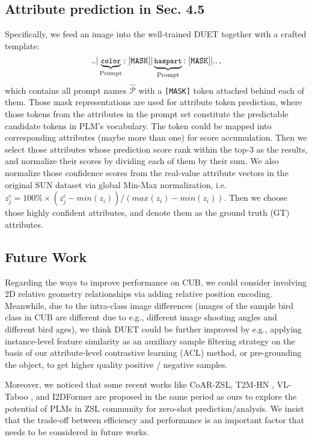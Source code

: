 \documentclass[letterpaper]{article} \usepackage{aaai23}  \usepackage{times}  \usepackage{helvet}  \usepackage{courier}  \usepackage[hyphens]{url}  \usepackage{graphicx} \urlstyle{rm} \def\UrlFont{\rm}  \usepackage{natbib}  \usepackage{caption} \frenchspacing  \setlength{\pdfpagewidth}{8.5in}  \setlength{\pdfpageheight}{11in}  \usepackage{algorithm}
\begin{document}
\subsection{Attribute prediction in Sec. 4.5}\label{apd:ap}
Specifically, we feed an image into the well-trained DUET together with a crafted template:
\begin{equation}
\small
	{\tt{..}} {\tt|} \underbrace{{\tt{color}}}_{\textrm{Prompt}} {\tt:}~  {\tt{[MASK]}}  {\tt|}  \underbrace{{\tt{has part}}}_{\textrm{Prompt}} {\tt:}~ {\tt{[MASK]}} {\tt|}	{\tt{..}}\, ,
\end{equation}
which contains all prompt names $\widehat{\mathcal{P}}$ with a {\tt [MASK]} token   attached behind each of them.
Those mask representations are used for attribute  token prediction, where those tokens from the attributes in {the prompt set} 
constitute the  predictable candidate tokens in PLM's vocabulary.
The token could be mapped into corresponding attributes (maybe more than one) for score accumulation.
Then we select those attributes whose prediction score rank within  the top-3  as the  results, and normalize  their scores 
by dividing each of them by their {sum.}
We also normalize those confidence score{s} from the real-value attribute vectors in {the} original SUN dataset via global Min-Max normalization, i.e. $z^c_j = 100\% \times (z^c_j - min(z_i))/(max(z_i)-min(z_i))$.
Then we choose those highly confident attributes, and denote them as the ground truth (GT)  attributes.

\subsection{Future Work}
Regarding the ways to improve performance on CUB, we could consider involving 2D relative geometry relationships via adding relative position encoding. Meanwhile, due to the intra-class image differences (images of the sample bird class in CUB are different due to e.g., different image shooting angles and different bird ages), we think DUET could be further improved by e.g., applying instance-level feature similarity as an auxiliary sample filtering strategy on the basis of our attribute-level contrastive learning (ACL) method, or pre-grounding the object, to get higher quality positive / negative samples.

Moreover, we noticed that some recent works like CoAR-ZSL\cite{DBLP:journals/corr/abs-2207-03824},  T2M-HN \cite{DBLP:journals/corr/abs-2210-15182}, VL-Taboo \cite{DBLP:journals/corr/abs-2209-06103}, and I2DFormer \cite{DBLP:journals/corr/abs-2209-10304} are proposed in the same period as ours to explore the potential of PLMs in ZSL community for zero-shot prediction/analysis. 
We insist that the trade-off between efficiency and performance is an important factor that needs to be considered in future works.
\end{document}
